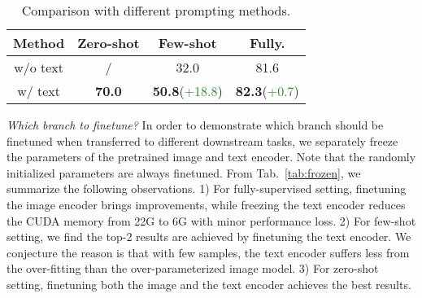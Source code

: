 \documentclass[runningheads]{llncs}
\begin{document}
\begin{table}[tb]
\begin{minipage}{0.475\columnwidth}
  \begin{tabular}{c|ccc}
  \toprule[0.5pt]
  Method & Zero-shot & Few-shot & Fully.\\
  \midrule
  w/o text & / & 32.0 & 81.6   \\
  w/ text & \textbf{70.0} & \textbf{50.8}\scriptsize(\textcolor{ForestGreen}{+18.8}) & \textbf{82.3}\scriptsize(\textcolor{ForestGreen}{+0.7})   \\
  \bottomrule[0.5pt]
  \end{tabular}
\label{tab:text}
\end{minipage}\noindent\hfill
\begin{minipage}{0.475\columnwidth}  
\centering
\caption{Comparison with different prompting methods.}
\label{tab:prompt}
\end{minipage}
\vspace{-0.6cm}
\end{table} 
 

\textit{Which branch to finetune?} In order to demonstrate which branch should be finetuned when transferred to different downstream tasks, we separately freeze the parameters of the pretrained image and text encoder. Note that the randomly initialized parameters are always finetuned. From Tab.~\ref{tab:frozen}, we summarize the following observations. 1) For fully-supervised setting, finetuning the image encoder brings  improvements, while freezing the text encoder reduces the CUDA memory from 22G to 6G with minor performance loss. 2) For few-shot setting, we find the top-2 results are achieved by finetuning the text encoder. We conjecture the reason is that with few samples, the text encoder suffers less from the over-fitting than the over-parameterized image model. 3) For zero-shot setting, finetuning both the image and the text encoder achieves the best results.
\end{document}
